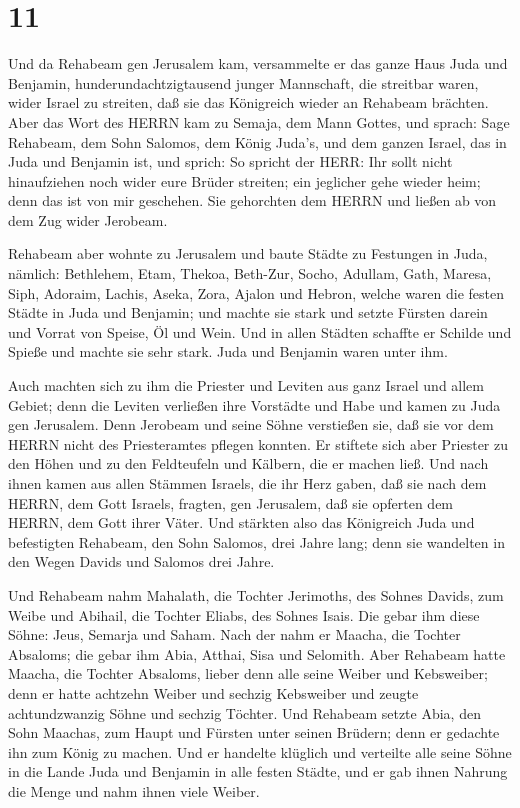 \hypertarget{section-10}{%
\section{11}\label{section-10}}

 Und da Rehabeam gen Jerusalem kam, versammelte er das ganze
Haus Juda und Benjamin, hunderundachtzigtausend junger Mannschaft, die
streitbar waren, wider Israel zu streiten, daß sie das Königreich wieder
an Rehabeam brächten.  Aber das Wort des HERRN kam zu
Semaja, dem Mann Gottes, und sprach:  Sage Rehabeam, dem
Sohn Salomos, dem König Juda's, und dem ganzen Israel, das in Juda und
Benjamin ist, und sprich:  So spricht der HERR: Ihr sollt
nicht hinaufziehen noch wider eure Brüder streiten; ein jeglicher gehe
wieder heim; denn das ist von mir geschehen. Sie gehorchten dem HERRN
und ließen ab von dem Zug wider Jerobeam.

 Rehabeam aber wohnte zu Jerusalem und baute Städte zu
Festungen in Juda,  nämlich: Bethlehem, Etam, Thekoa,
 Beth-Zur, Socho, Adullam,  Gath, Maresa, Siph,
 Adoraim, Lachis, Aseka,  Zora, Ajalon und
Hebron, welche waren die festen Städte in Juda und Benjamin;
 und machte sie stark und setzte Fürsten darein und Vorrat
von Speise, Öl und Wein.  Und in allen Städten schaffte er
Schilde und Spieße und machte sie sehr stark. Juda und Benjamin waren
unter ihm.

 Auch machten sich zu ihm die Priester und Leviten aus ganz
Israel und allem Gebiet;  denn die Leviten verließen ihre
Vorstädte und Habe und kamen zu Juda gen Jerusalem. Denn Jerobeam und
seine Söhne verstießen sie, daß sie vor dem HERRN nicht des
Priesteramtes pflegen konnten.  Er stiftete sich aber
Priester zu den Höhen und zu den Feldteufeln und Kälbern, die er machen
ließ.  Und nach ihnen kamen aus allen Stämmen Israels, die
ihr Herz gaben, daß sie nach dem HERRN, dem Gott Israels, fragten, gen
Jerusalem, daß sie opferten dem HERRN, dem Gott ihrer Väter.
 Und stärkten also das Königreich Juda und befestigten
Rehabeam, den Sohn Salomos, drei Jahre lang; denn sie wandelten in den
Wegen Davids und Salomos drei Jahre.

 Und Rehabeam nahm Mahalath, die Tochter Jerimoths, des
Sohnes Davids, zum Weibe und Abihail, die Tochter Eliabs, des Sohnes
Isais.  Die gebar ihm diese Söhne: Jeus, Semarja und Saham.
 Nach der nahm er Maacha, die Tochter Absaloms; die gebar
ihm Abia, Atthai, Sisa und Selomith.  Aber Rehabeam hatte
Maacha, die Tochter Absaloms, lieber denn alle seine Weiber und
Kebsweiber; denn er hatte achtzehn Weiber und sechzig Kebsweiber und
zeugte achtundzwanzig Söhne und sechzig Töchter.  Und
Rehabeam setzte Abia, den Sohn Maachas, zum Haupt und Fürsten unter
seinen Brüdern; denn er gedachte ihn zum König zu machen. 
Und er handelte klüglich und verteilte alle seine Söhne in die Lande
Juda und Benjamin in alle festen Städte, und er gab ihnen Nahrung die
Menge und nahm ihnen viele Weiber.

